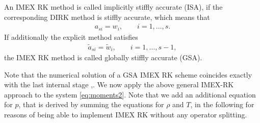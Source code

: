 \documentclass[final,11pt]{siamart251216}
\numberwithin{equation}{section}
\theoremstyle{definition}
\theoremstyle{remark}
\begin{document}
\begin{definition}
	An IMEX RK method is called implicitly stiffly accurate (ISA), if the corresponding DIRK method is stiffly accurate, which means that
	\begin{align*}
		a_{si} = w_i, \qquad i = 1,\dots,s.
	\end{align*}
	If additionally the explicit method satisfies
	\begin{align}
		\tilde{a}_{si} = \tilde{w}_i, \qquad i = 1,\dots,s-1,
	\end{align}
	the IMEX RK method is called globally stiffly accurate (GSA).
\end{definition}
Note that the numerical solution of a GSA IMEX RK scheme coincides exactly with the last internal stage \cite{IMEX_PR},\cite{Hairer}. We now apply the above general IMEX-RK approach to the system \eqref{eq:moments2}. Note that we add an additional equation for $p$, that is derived by summing the equations for $\rho$ and $T$, in the following for reasons of being able to implement IMEX RK without any operator splitting.
\end{document}
